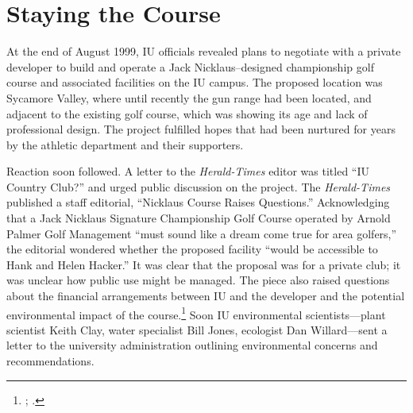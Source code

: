 \documentclass[
  american,
  letterpaper,
]{scrreprt}
\begin{document}
\section{Staying the Course}\label{staying-the-course}

At the end of August 1999, IU officials revealed plans to negotiate with
a private developer to build and operate a Jack Nicklaus--designed
championship golf course and associated facilities on the IU campus. The
proposed location was Sycamore Valley, where until recently the gun
range had been located, and adjacent to the existing golf course, which
was showing its age and lack of professional design. The project
fulfilled hopes that had been nurtured for years by the athletic
department and their supporters.

Reaction soon followed. A letter to the \emph{Herald-Times} editor was
titled ``IU Country Club?'' and urged public discussion on the project.
The \emph{Herald-Times} published a staff editorial, ``Nicklaus Course
Raises Questions.'' Acknowledging that a Jack Nicklaus Signature
Championship Golf Course operated by Arnold Palmer Golf Management
``must sound like a dream come true for area golfers,'' the editorial
wondered whether the proposed facility ``would be accessible to Hank and
Helen Hacker.'' It was clear that the proposal was for a private club;
it was unclear how public use might be managed. The piece also raised
questions about the financial arrangements between IU and the developer
and the potential environmental impact of the course.\footnote{; .} Soon IU environmental scientists---plant scientist Keith
Clay, water specialist Bill Jones, ecologist Dan Willard---sent a letter
to the university administration outlining environmental concerns and
recommendations.
\end{document}
